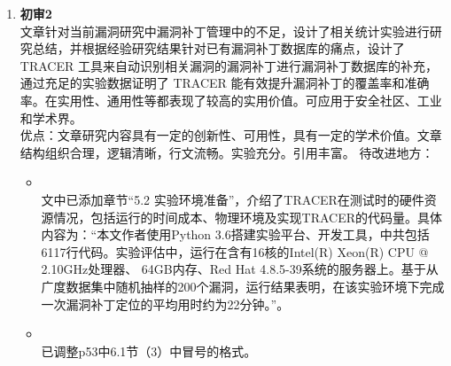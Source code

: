 \begin{enumerate}[]
  \item \textbf{初审2}\\
  文章针对当前漏洞研究中漏洞补丁管理中的不足，设计了相关统计实验进行研究总结，并根据经验研究结果针对已有漏洞补丁数据库的痛点，设计了 TRACER 工具来自动识别相关漏洞的漏洞补丁进行漏洞补丁数据库的补充，通过充足的实验数据证明了 TRACER 能有效提升漏洞补丁的覆盖率和准确率。在实用性、通用性等都表现了较高的实用价值。可应用于安全社区、工业和学术界。\\

  优点：文章研究内容具有一定的创新性、可用性，具有一定的学术价值。文章结构组织合理，逻辑清晰，行文流畅。实验充分。引用丰富。
  待改进地方： 
  \begin{itemize}[]
      \item {}\\
        文中已添加章节“5.2 实验环境准备”，介绍了TRACER在测试时的硬件资源情况，包括运行的时间成本、物理环境及实现TRACER的代码量。具体内容为：“本文作者使用Python 3.6搭建实验平台、开发工具\tool ，\tool 中共包括6117行代码。实验评估中，\tool 运行在含有16核的Intel(R) Xeon(R) CPU @ 2.10GHz处理器、 64GB内存、Red Hat 4.8.5-39系统的服务器上。基于从广度数据集中随机抽样的200个漏洞，运行结果表明，\tool 在该实验环境下完成一次漏洞补丁定位的平均用时约为22分钟。”。
      \item {}\\
        已调整p53中6.1节（3）中冒号的格式。
  \end{itemize}
  
\end{enumerate}




